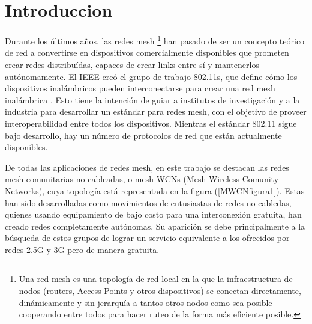 
\chapter{Introduccion} %

\label{Chapter1} %


\newcommand{\keyword}[1]{\textbf{#1}}
\newcommand{\tabhead}[1]{\textbf{#1}}
\newcommand{\code}[1]{\texttt{#1}}
\newcommand{\file}[1]{\texttt{\bfseries#1}}
\newcommand{\option}[1]{\texttt{\itshape#1}}


Durante los últimos años, las redes mesh \footnote{Una red mesh es una topología de red local en la que la infraestructura de nodos (routers, Access Points y otros dispositivos) se conectan directamente, dinámicamente y sin jerarquía a tantos otros nodos como sea posible cooperando entre todos para hacer ruteo de la forma más eficiente posible.} han pasado de ser un concepto teórico de red a convertirse en dispositivos comercialmente disponibles que prometen crear redes distribuídas, capaces de crear links entre sí y mantenerlos autónomamente. El IEEE creó el grupo de trabajo 802.11s, que define cómo los dispositivos inalámbricos pueden interconectarse para crear una red  mesh inalámbrica \cite{IEEE802WIKIPEDIA}. Esto tiene la intención de guiar a institutos de investigación y a la industria para desarrollar un estándar para redes mesh, con el objetivo de proveer interoperabilidad entre todos los dispositivos. Mientras el estándar 802.11 sigue bajo desarrollo, hay un número de protocolos de red que están actualmente disponibles.

De todas las aplicaciones de redes mesh, en este trabajo se destacan las redes mesh comunitarias no cableadas, o mesh WCNs (Mesh Wireless Comunity Networks), cuya topología está representada en la figura (\ref{MWCNfigura1}). Estas han sido desarrolladas como movimientos de entusiastas de redes no cabledas, quienes usando equipamiento de bajo costo para una interconexión gratuita, han creado redes completamente autónomas. Su aparición se debe principalmente a la búsqueda de estos grupos de lograr un servicio equivalente a los ofrecidos por redes 2.5G y 3G pero de manera gratuita\cite{PAPERcitadoPORalthea}. 


